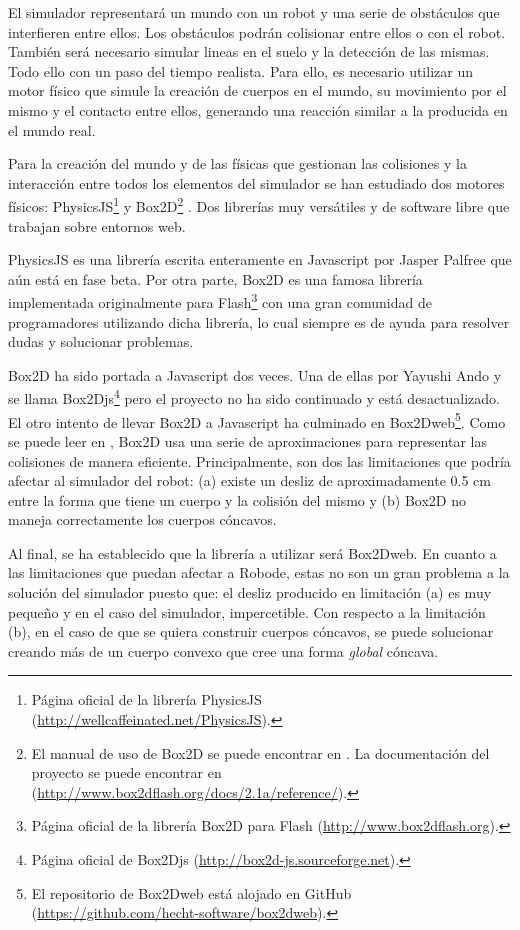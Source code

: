 El simulador representará un mundo con un robot y una serie de obstáculos que interfieren entre ellos. Los obstáculos podrán colisionar entre ellos o con el robot. También será necesario simular lineas en el suelo y la detección de las mismas. Todo ello con un paso del tiempo realista. Para ello, es necesario utilizar un motor físico que simule la creación de cuerpos en el mundo, su movimiento por el mismo y el contacto entre ellos, generando una reacción similar a la producida en el mundo real.

Para la creación del mundo y de las físicas que gestionan las colisiones y la interacción entre todos los elementos del simulador se han estudiado dos motores físicos: PhysicsJS\footnote{Página oficial de la librería PhysicsJS (\url{http://wellcaffeinated.net/PhysicsJS}).} y Box2D\footnote{El manual de uso de Box2D se puede encontrar en \cite{box2d-manual}. La documentación del proyecto se puede encontrar en (\url{http://www.box2dflash.org/docs/2.1a/reference/}).} \cite{box2d}. Dos librerías muy versátiles y de software libre que trabajan sobre entornos web.

PhysicsJS  es una librería escrita enteramente en Javascript por Jasper Palfree que aún está en fase beta. Por otra parte, Box2D es una famosa librería implementada originalmente para Flash\footnote{Página oficial de la librería Box2D para Flash (\url{http://www.box2dflash.org}).} con una gran comunidad de programadores utilizando dicha librería, lo cual siempre es de ayuda para resolver dudas y solucionar problemas. 

Box2D ha sido portada a Javascript dos veces. Una de ellas por Yayushi Ando y se llama Box2Djs\footnote{Página oficial de Box2Djs (\url{http://box2d-js.sourceforge.net}).} pero el proyecto no ha sido continuado y está desactualizado. El otro intento de llevar Box2D a Javascript ha culminado en Box2Dweb\footnote{El repositorio de Box2Dweb está alojado en GitHub (\url{https://github.com/hecht-software/box2dweb}).}. Como se puede leer en \cite[capítulo 13]{box2d-manual}, Box2D usa una serie de aproximaciones para representar las colisiones de manera eficiente. Principalmente, son dos las limitaciones que podría afectar al simulador del robot: (a) existe un desliz de aproximadamente 0.5 cm entre la forma que tiene un cuerpo y la colisión del mismo y (b) Box2D no maneja correctamente los cuerpos cóncavos. 

Al final, se ha establecido que la librería a utilizar será Box2Dweb. En cuanto a las limitaciones que puedan afectar a Robode, estas no son un gran problema a la solución del simulador puesto que: el desliz producido en limitación (a) es muy pequeño y en el caso del simulador, impercetible. Con respecto a la limitación (b), en el caso de que se quiera construir cuerpos cóncavos, se puede solucionar creando más de un cuerpo convexo que cree una forma \emph{global} cóncava.

